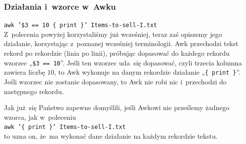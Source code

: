\documentclass[10pt,t]{beamer}
\begin{document}
\begin{frame}
  \frametitle{Działania i~wzorce w~Awku}


  \texttt{awk '\$3 == 10 \{ print \}' Items-to-sell-I.txt} \\
  Z~polecenia powyżej korzystaliśmy już wcześniej, teraz zaś opiszemy jego
  działanie, korzystając z~poznanej wcześniej terminologii. Awk przechodzi
  tekst rekord po rekordzie (linia po linii), próbując dopasować do każdego
  rekordu wzorzec „\texttt{\$3 == 10}”. Jeśli ten wzorzec uda~się dopasować,
  czyli trzecia kolumna zawiera liczbę $10$, to Awk wykonuje na danym
  rekordzie działanie „\texttt{\{ print \}}”. Jeśli wzorzec nie zostanie
  dopasowany, to Awk nie robi nic i~przechodzi do następnego rekordu.

  Jak już~się Państwo zapewne domyślili, jeśli Awkowi nie prześlemy żadnego
  wzorca, jak w~poleceniu \\
  \texttt{awk '\{ print \}' Items-to-sell-I.txt} \\
  to uzna on, że~ma wykonać dane działanie na każdym rekordzie tekstu.

\end{frame}
\end{document}
